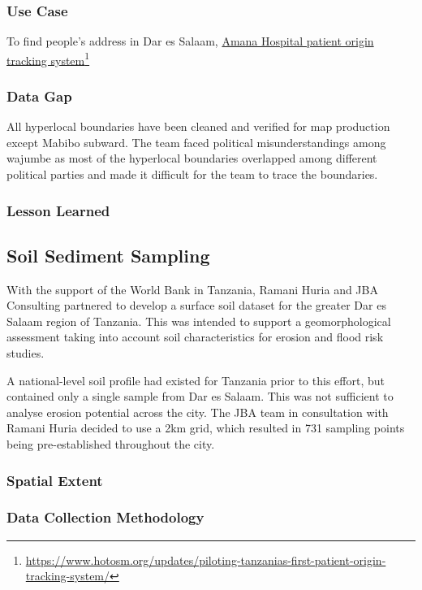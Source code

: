 \documentclass[a4paper,12pt,twoside]{article}
\begin{document}
\subsubsection{Use Case}
To find people’s address in Dar es Salaam, \href{https://www.hotosm.org/updates/piloting-tanzanias-first-patient-origin-tracking-system/}{Amana Hospital patient origin tracking system}\footnote{\url{https://www.hotosm.org/updates/piloting-tanzanias-first-patient-origin-tracking-system/}}

\subsubsection{Data Gap}
All hyperlocal boundaries have been cleaned and verified for map production except Mabibo subward. The team faced political misunderstandings among wajumbe as most of the hyperlocal boundaries overlapped among different political parties and made it difficult for the team to trace the boundaries.

\subsubsection{Lesson Learned}

\newpage
\subsection{Soil Sediment Sampling}

With the support of the World Bank in Tanzania, Ramani Huria and JBA Consulting partnered to develop a surface soil dataset for the greater Dar es Salaam region of Tanzania. This was intended to support a geomorphological assessment taking into account soil characteristics for erosion and flood risk studies.

\medskip

A national-level soil profile had existed for Tanzania prior to this effort, but contained only a single sample from Dar es Salaam. This was not sufficient to analyse erosion potential across the city. The JBA team in consultation with Ramani Huria decided to use a 2km grid, which resulted in 731 sampling points being pre-established throughout the city.

\subsubsection{Spatial Extent}

\subsubsection{Data Collection Methodology}
\end{document}
